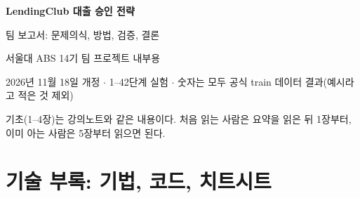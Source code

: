 \documentclass[11pt]{report}
\begin{document}
\begin{titlepage}\centering
\vspace*{30mm}
{\Huge\bfseries LendingClub 대출 승인 전략\par}\medskip
{\Large 팀 보고서: 문제의식, 방법, 검증, 결론\par}
\vspace{12mm}
{\large 서울대 ABS 14기 팀 프로젝트 내부용\par}
\vspace{4mm}
{\small 2026년 11월 18일 개정 \ensuremath{\cdot} 1--42단계 실험 \ensuremath{\cdot} 숫자는 모두 공식 train 데이터 결과(예시라고 적은 것 제외)\par}
\vfill
{\small 기초(1--4장)는 강의노트와 같은 내용이다. 처음 읽는 사람은 요약을 읽은 뒤 1장부터, 이미 아는 사람은 5장부터 읽으면 된다.\par}
\end{titlepage}

\tableofcontents













\appendix


\part{기술 부록: 기법, 코드, 치트시트}










\end{document}
